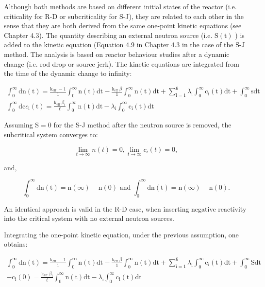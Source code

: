 \documentclass[10pt]{article}
\begin{document}
Although both methods are based on different initial states of the reactor (i.e. criticality for R-D or subcriticality for S-J), they are related to each other in the sense that they are both derived from the same one-point kinetic equations (see Chapter 4.3). The quantity describing an external neutron source (i.e. $\mathrm{S}(\mathrm{t})$ ) is added to the kinetic equation (Equation $4.9$ in Chapter $4.3$ in the case of the S-J method. The analysis is based on reactor behaviour studies after a dynamic change (i.e. rod drop or source jerk). The kinetic equations are integrated from the time of the dynamic change to infinity:

$$
\begin{gathered}
\int_{0}^{\infty} \mathrm{dn}(\mathrm{t})=\frac{\mathrm{k}_{\text {eff }}-1}{1} \int_{0}^{\infty} \mathrm{n}(\mathrm{t}) \mathrm{dt}-\frac{\mathrm{k}_{\text {eff }} \beta}{1} \int_{0}^{\infty} \mathrm{n}(\mathrm{t}) \mathrm{dt}+\sum_{\mathrm{i}=1}^{6} \lambda_{\mathrm{i}} \int_{0}^{\infty} \mathrm{c}_{\mathrm{i}}(\mathrm{t}) \mathrm{dt}+\int_{0}^{\infty} \mathrm{sdt} \\
\int_{0}^{\infty} \mathrm{dc} c_{\mathrm{i}}(\mathrm{t})=\frac{\mathrm{k}_{\text {eff }} \beta_{\mathrm{i}}}{\ell} \int_{0}^{\infty} \mathrm{n}(\mathrm{t}) \mathrm{dt}-\lambda_{\mathrm{i}} \int_{0}^{\infty} \mathrm{c}_{\mathrm{i}}(\mathrm{t}) \mathrm{dt}
\end{gathered}
$$

Assuming $\mathrm{S}=0$ for the S-J method after the neutron source is removed, the subcritical system converges to:

$$
\lim _{t \rightarrow \infty} n(t)=0, \lim _{t \rightarrow \infty} c_{i}(t)=0,
$$

and,

$$
\int_{0}^{\infty} \mathrm{dn}(\mathrm{t})=\mathrm{n}(\infty)-\mathrm{n}(0) \text { and } \int_{0}^{\infty} \mathrm{dn}(\mathrm{t})=\mathrm{n}(\infty)-\mathrm{n}(0) .
$$

An identical approach is valid in the R-D case, when inserting negative reactivity into the critical system with no external neutron sources.

Integrating the one-point kinetic equation, under the previous assumption, one obtains:

$$
\begin{gathered}
\int_{0}^{\infty} \mathrm{dn}(\mathrm{t})=\frac{\mathrm{k}_{\text {eff }}-1}{1} \int_{0}^{\infty} \mathrm{n}(\mathrm{t}) \mathrm{dt}-\frac{\mathrm{k}_{\text {eff }} \beta}{1} \int_{0}^{\infty} \mathrm{n}(\mathrm{t}) \mathrm{dt}+\sum_{\mathrm{i}=1}^{6} \lambda_{\mathrm{i}} \int_{0}^{\infty} \mathrm{c}_{\mathrm{i}}(\mathrm{t}) \mathrm{dt}+\int_{0}^{\infty} \mathrm{Sdt} \\
-\mathrm{c}_{\mathrm{i}}(0)=\frac{\mathrm{k}_{\text {eff }} \beta_{\mathrm{i}}}{\ell} \int_{0}^{\infty} \mathrm{n}(\mathrm{t}) \mathrm{dt}-\lambda_{\mathrm{i}} \int_{0}^{\infty} \mathrm{c}_{\mathrm{i}}(\mathrm{t}) \mathrm{dt}
\end{gathered}
$$
\end{document}
